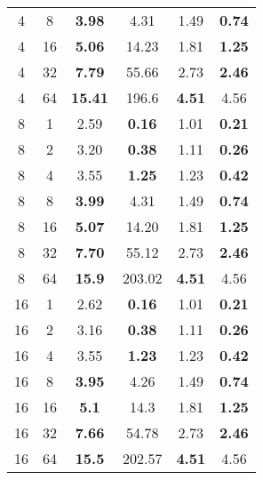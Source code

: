 \begin{table}[!ht]
\begin{tabular}{@{}cccccc@{}}
		4 & 8 & \textbf{3.98} & 4.31 & 1.49 & \textbf{0.74} \\ 
		4 & 16 & \textbf{5.06} & 14.23 & 1.81 & \textbf{1.25} \\ 
		4 & 32 & \textbf{7.79} & 55.66 & 2.73 & \textbf{2.46} \\ 
		4 & 64 & \textbf{15.41} & 196.6 & \textbf{4.51} & 4.56 \\ \midrule
		8 & 1 & 2.59 & \textbf{0.16} & 1.01 & \textbf{0.21} \\ 
		8 & 2 & 3.20 & \textbf{0.38} & 1.11 & \textbf{0.26} \\ 
		8 & 4 & 3.55 & \textbf{1.25} & 1.23 & \textbf{0.42} \\ 
		8 & 8 & \textbf{3.99} & 4.31 & 1.49 & \textbf{0.74} \\ 
		8 & 16 & \textbf{5.07} & 14.20 & 1.81 & \textbf{1.25} \\ 
		8 & 32 & \textbf{7.70} & 55.12 & 2.73 & \textbf{2.46} \\ 
		8 & 64 & \textbf{15.9} & 203.02 & \textbf{4.51} & 4.56 \\ \midrule
		16 & 1 & 2.62 & \textbf{0.16} & 1.01 & \textbf{0.21} \\ 
		16 & 2 & 3.16 & \textbf{0.38} & 1.11 & \textbf{0.26} \\ 
		16 & 4 & 3.55 & \textbf{1.23} & 1.23 & \textbf{0.42} \\ 
		16 & 8 & \textbf{3.95} & 4.26 & 1.49 & \textbf{0.74} \\ 
		16 & 16 & \textbf{5.1} & 14.3 & 1.81 & \textbf{1.25} \\ 
		16 & 32 & \textbf{7.66} & 54.78 & 2.73 & \textbf{2.46} \\ 
		16 & 64 & \textbf{15.5} & 202.57 & \textbf{4.51} & 4.56 \\ \bottomrule
	\end{tabular}
\end{table}